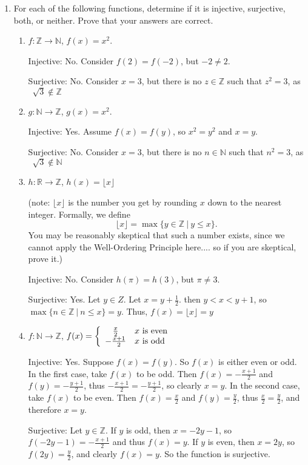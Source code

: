 \documentclass[12pt]{article}
\newcommand{\Z}{\mathbb{Z}}
\newcommand{\R}{\mathbb{R}}
\newcommand{\N}{\mathbb{N}}
\begin{document}
\begin{enumerate}
\item For each of the following functions, determine if it is injective, surjective, both, or neither. Prove that your answers are correct.

\begin{enumerate}
\item $f:\Z\to\N$, $f(x) = x^2$.

Injective: No. Consider $f(2) = f(-2)$, but $-2 \neq 2$. 

Surjective: No. Consider $x = 3$, but there is no $z \in \Z$ such that $z^2 = 3$, as $\ \sqrt[]{3} \notin \Z$
\item $g:\N\to\Z$, $g(x)=x^2$.

Injective: Yes. Assume $f(x) = f(y)$, so $x^2 = y^2$ and $x = y$. 

Surjective: No. Consider $x = 3$, but there is no $n \in \N$ such that $n^2 = 3$, as $\ \sqrt[]{3} \notin \N$
\item $h:\R\to\Z$, $h(x) = \lfloor x\rfloor$ 

(note: $\lfloor x\rfloor$ is the number you get by rounding $x$ down to the nearest integer. Formally, we define \[\lfloor x\rfloor = \max\{ y\in \Z\ | \ y\leq x\}.\] You may be reasonably skeptical that such a number exists, since we cannot apply the Well-Ordering Principle here.... so if you are skeptical, prove it.)


Injective: No. Consider $h(\pi) = h(3)$, but $\pi \neq 3$. 

Surjective: Yes. Let $y \in Z$. Let $x = y + \frac{1}{2}$. then $y < x < y + 1$, so $\max\{ n\in \Z\ | \ n\leq x\} = y$. Thus, $f(x) = \lfloor x\rfloor = y$


\item $f: \N\to \Z$, $f(x) = \left\{\begin{array}{cl} \frac{x}{2} & x\hbox{ is even}\\ -\frac{x+1}{2} & x\hbox{ is odd}\end{array}\right.$

Injective: Yes. Suppose $f(x) = f(y)$. So $f(x)$ is either even or odd. In the first case, take $f(x)$ to be odd. Then $f(x) = -\frac{x+1}{2}$ and $f(y) = -\frac{y+1}{2}$, thus $-\frac{x+1}{2} = -\frac{y+1}{2}$, so clearly $x = y$. In the second case, take $f(x)$ to be even. Then $f(x) = \frac{x}{2}$ and $f(y) = \frac{y}{2}$, thus $\frac{x}{2} = \frac{y}{2}$, and therefore $x = y$.

Surjective: Let $y \in \Z$. If $y$ is odd, then $x = -2y - 1$, so $f(-2y - 1) = -\frac{x+1}{2}$ and thus $f(x) = y$. If $y$ is even, then $x = 2y$, so $f(2y) = \frac{y}{2}$, and clearly $f(x) = y$. So the function is surjective.


\end{enumerate}
\end{enumerate}
\end{document}
